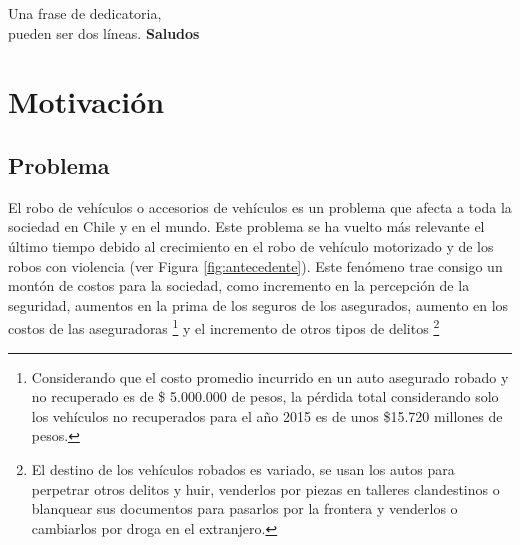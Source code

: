 \documentclass[letterpaper,12pt,oneside]{book} %
\begin{document}



\newcommand{\quotes}[1]{``#1''}

\begin{dedicatoria}
	Una frase de dedicatoria, \\
	pueden ser dos líneas. \newp
	\textbf{Saludos}
\end{dedicatoria}

\begin{agradecimientos}
	\lipsum[1]
\end{agradecimientos}



\begin{resumen}
	\lipsum[1]
\end{resumen}


\hypersetup{
    citecolor=Blue
}
\chapter{Motivación}
\section{Problema}
El robo de vehículos o accesorios de vehículos es un problema que afecta a toda la sociedad en Chile y en el mundo. Este problema se ha vuelto más relevante el último tiempo debido al crecimiento en el robo de vehículo motorizado y de los robos con violencia (ver Figura \ref{fig:antecedente}). Este fenómeno trae consigo un montón de costos para la sociedad, como incremento en la percepción de la seguridad, aumentos en la prima de los seguros de los asegurados, aumento en los costos de las aseguradoras \footnote{Considerando que el costo promedio incurrido en un auto asegurado robado y no recuperado es de \$ 5.000.000 de pesos, la pérdida total considerando solo los vehículos no recuperados para el año 2015 es de unos \$15.720 millones de pesos.} y el incremento de otros tipos de delitos \footnote{El destino de los vehículos robados es variado, se usan los autos para perpetrar otros delitos y huir, venderlos por piezas en talleres clandestinos o blanquear sus documentos para pasarlos por la frontera y venderlos o cambiarlos por droga en el extranjero.} 
\end{document}
